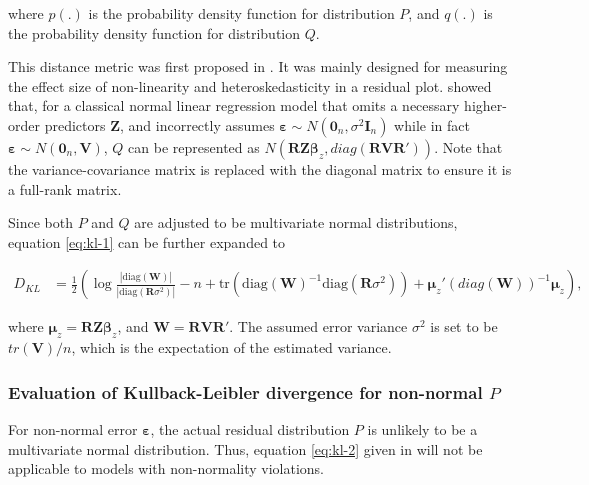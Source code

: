 \documentclass[]{interact}
\theoremstyle{plain}%
\theoremstyle{definition}
\theoremstyle{remark}
\begin{document}
\noindent where \(p(.)\) is the probability density function for
distribution \(P\), and \(q(.)\) is the probability density function for
distribution \(Q\).

This distance metric was first proposed in \citet{li2023plot}. It was
mainly designed for measuring the effect size of non-linearity and
heteroskedasticity in a residual plot. \citet{li2023plot} showed that,
for a classical normal linear regression model that omits a necessary
higher-order predictors \(\boldsymbol{Z}\), and incorrectly assumes
\(\boldsymbol{\varepsilon} \sim N(\boldsymbol{0}_n,\sigma^2\boldsymbol{I}_n)\)
while in fact
\(\boldsymbol{\varepsilon} \sim N(\boldsymbol{0}_n, \boldsymbol{V})\),
\(Q\) can be represented as
\(N(\boldsymbol{R}\boldsymbol{Z}\boldsymbol{\beta}_z, diag(\boldsymbol{R}\boldsymbol{V}\boldsymbol{R}'))\).
Note that the variance-covariance matrix is replaced with the diagonal
matrix to ensure it is a full-rank matrix.

Since both \(P\) and \(Q\) are adjusted to be multivariate normal
distributions, equation \ref{eq:kl-1} can be further expanded to

\begin{align}
\label{eq:kl-2}
D_{KL} &= \frac{1}{2}\left(\log\frac{|\text{diag}(\boldsymbol{W})|}{|\text{diag}(\boldsymbol{R}\sigma^2)|} - n + \text{tr}(\text{diag}(\boldsymbol{W})^{-1}\text{diag}(\boldsymbol{R}\sigma^2)) + \boldsymbol{\mu}_z'(diag(\boldsymbol{W}))^{-1}\boldsymbol{\mu}_z\right),
\end{align}

\noindent where
\(\boldsymbol{\mu}_z = \boldsymbol{R}\boldsymbol{Z}\boldsymbol{\beta}_z\),
and \(\boldsymbol{W} = \boldsymbol{R}\boldsymbol{V}\boldsymbol{R}'\).
The assumed error variance \(\sigma^2\) is set to be
\(tr(\boldsymbol{V})/n\), which is the expectation of the estimated
variance.

\hypertarget{evaluation-of-kullback-leibler-divergence-for-non-normal-p}{%
\subsubsection{\texorpdfstring{Evaluation of Kullback-Leibler divergence
for non-normal
\(P\)}{Evaluation of Kullback-Leibler divergence for non-normal P}}\label{evaluation-of-kullback-leibler-divergence-for-non-normal-p}}

For non-normal error \(\boldsymbol{\varepsilon}\), the actual residual
distribution \(P\) is unlikely to be a multivariate normal distribution.
Thus, equation \ref{eq:kl-2} given in \citet{li2023plot} will not be
applicable to models with non-normality violations.
\end{document}
